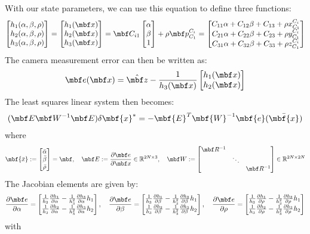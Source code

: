 \documentclass[10pt,letterpaper,fleqn,oneside]{article}
\newcommand{\Real}{\mathbb R}
\newcommand{\bbm}{\begin{bmatrix}}
\newcommand{\ebm}{\end{bmatrix}}
\begin{document}
With our state parameters, we can use this equation to define three functions:
\begin{align}
\bbm h_1 (\alpha, \beta, \rho) \\ h_2 (\alpha, \beta, \rho) \\ h_3 (\alpha, \beta, \rho) \ebm = \bbm h_1 (\mbf x) \\ h_2 (\mbf x) \\ h_3 (\mbf x) \ebm = \mbf C_{i1} \bbm \alpha \\ \beta \\ 1 \ebm + \rho  \mbf p^{C_i}_{C_1} = \bbm C_{11} \alpha + C_{12} \beta + C_{13} + \rho x^{C_i}_{C_1} \\ C_{21} \alpha + C_{22} \beta + C_{23} + \rho y^{C_i}_{C_1} \\ C_{31} \alpha + C_{32} \beta + C_{33} + \rho z^{C_i}_{C_1}   \ebm 
\end{align}
The camera measurement error can then be written as:
\begin{align}
\mbf e(\mbf x) = \hat{\mbf z} - \frac{1}{h_3 (\mbf x) } \bbm h_1 (\mbf x) \\ h_2 (\mbf x) \ebm
\end{align}
The least squares linear system then becomes:
\begin{align}
(\mbf  E \mbf W ^{-1} \mbf E ) \delta \mbf{x}^*  = - \mbf{E}^T\mbf{W}^{-1}\mbf{e}(\bar{\mbf{x}})
\end{align}
where
\begin{align}
\mbf{\bar{x}} := \bbm \bar{\alpha} \\ \bar{\beta} \\ \bar{\rho} \ebm = \mbf, \quad \mbf E := \frac{\partial \mbf e}{\partial \mbf x} \in \Real^{2 N \times 3 }, \quad \mbf W := \bbm \mbf R^{-1} & & \\ & \ddots & \\ & & \mbf R^{-1} \ebm \in \Real^{2 N \times 2 N}
\end{align}
The Jacobian elements are given by:
\begin{align}
\frac{\partial \mbf e}{\partial \alpha} = \bbm \frac{1}{h_3} \frac{\partial h_1}{\partial \alpha} - \frac{1}{h_3^2} \frac{\partial h_3}{\partial \alpha} h_1 \\ \frac{1}{h_3} \frac{\partial h_2}{\partial \alpha} - \frac{1}{h_3^2} \frac{\partial h_3}{\partial \alpha} h_2 \ebm, \quad
\frac{\partial \mbf e}{\partial \beta} = \bbm \frac{1}{h_3} \frac{\partial h_1}{\partial \beta} - \frac{1}{h_3^2} \frac{\partial h_3}{\partial \beta} h_1 \\ \frac{1}{h_3} \frac{\partial h_2}{\partial \beta} - \frac{1}{h_3^2} \frac{\partial h_3}{\partial \beta} h_2 \ebm, \quad
\frac{\partial \mbf e}{\partial \rho} = \bbm \frac{1}{h_3} \frac{\partial h_1}{\partial \rho} - \frac{1}{h_3^2} \frac{\partial h_3}{\partial \rho} h_1 \\ \frac{1}{h_3} \frac{\partial h_2}{\partial \rho} - \frac{1}{h_3^2} \frac{\partial h_3}{\partial \rho} h_2 \ebm
\end{align}
with
\end{document}
